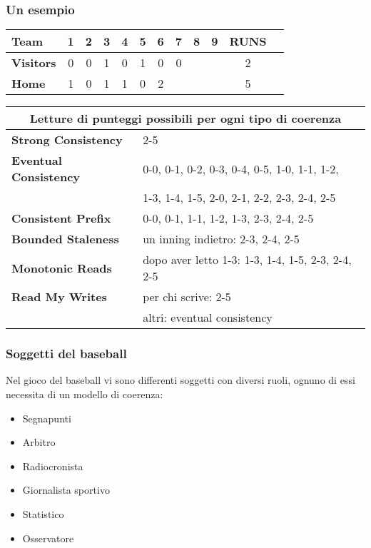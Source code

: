 \begin{frame}
\frametitle{Un esempio}  
\begin{center}
 \begin{tabular}{l*{10}{c}r}
  \textbf{Team}              & \textbf{1} & \textbf{2} & \textbf{3} & \textbf{4} & \textbf{5} & \textbf{6} & \textbf{7} & \textbf{8} & \textbf{9} & \textbf{RUNS} \\
 \hline
  \textbf{Visitors}     & 0 & 0 & 1 & 0 & 1 & 0 & 0 &  &  & 2 \\
  \textbf{Home}         & 1 & 0 & 1 & 1 & 0 & 2 &   &  &  & 5 \\
 \end{tabular}
\end{center}

\begin{center}
 \begin{tabular}{ |l|l| }
  \hline
  \multicolumn{2}{|c|}{Letture di punteggi possibili per ogni tipo di coerenza} \\
  \hline
  \textbf{Strong Consistency}   & 2-5 \\
  \hline
  \textbf{Eventual Consistency} & 0-0, 0-1, 0-2, 0-3, 0-4, 0-5, 1-0, 1-1, 1-2,\\
                                & 1-3, 1-4, 1-5, 2-0, 2-1, 2-2, 2-3, 2-4, 2-5 \\
  \hline
  \textbf{Consistent Prefix}    & 0-0, 0-1, 1-1, 1-2, 1-3, 2-3, 2-4, 2-5 \\
  \hline
  \textbf{Bounded Staleness}    & un inning indietro: 2-3, 2-4, 2-5 \\
  \hline  
  \textbf{Monotonic Reads}      & dopo aver letto 1-3: 1-3, 1-4, 1-5, 2-3, 2-4, 2-5 \\
  \hline  
  \textbf{Read My Writes}       & per chi scrive: 2-5 \\
                                & altri: eventual consistency \\
  \hline
 \end{tabular}
\end{center}
\end{frame}

\begin{frame}
 \frametitle{Soggetti del baseball}
 Nel gioco del baseball vi sono differenti soggetti con diversi ruoli, ognuno di essi necessita di un modello di coerenza:\\
 \begin{itemize}
   \item Segnapunti
   \item Arbitro
   \item Radiocronista
   \item Giornalista sportivo
   \item Statistico
   \item Osservatore
 \end{itemize}
\end{frame}

